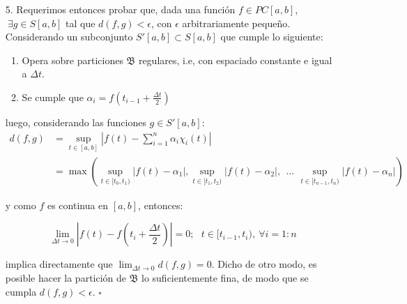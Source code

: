 \documentclass[spanish, fleqn]{article}
\begin{document}
\begin{itemize}
    tal sucesión puede construirse como sigue:
     \begin{displaymath}
       a_n = \left\{
     \begin{array}{lr}
       1 &  n = n_1 \\
       0 &  \text{otherwise}
     \end{array}
   \right.
   \end{displaymath}

   con $n_1 (\in \mathbb{N}) \rightarrow \infty$ se satisface (\ref{eq:req}).




    \item[5.] Requerimos entonces probar que, dada una función $f \in PC[a,b]$, $\ \exists g \in S[a,b]$ tal que $d(f,g)<\epsilon$, con $\epsilon$ arbitrariamente pequeño. Considerando un subconjunto $S'[a,b] \subset S[a,b]$ que cumple lo siguiente:

\begin{enumerate}
    \item Opera sobre particiones $\mathfrak{B}$ regulares, i.e, con espaciado constante e igual a $\Delta t$.
    \item Se cumple que $\alpha_i = f(t_{i-1}+\frac{\Delta t}{2})$
\end{enumerate}

luego, considerando las funciones $g \in S'[a,b]$:
\begin{equation} \label{eq1}
\begin{split}
d(f,g) & = \sup_{t\in [a,b]}{\left|f(t)-\sum_{i=1}^n \alpha_i \chi_i(t)\right|} \\
       & = \max \left(  \sup_{t \in [t_0,t_1)} |f(t)-\alpha_1|, \sup_{t \in [t_1,t_2)} |f(t)-\alpha_2|,\ \ \ldots \ \, \sup_{t \in [t_{n-1},t_n)} |f(t)-\alpha_n| \right)
\end{split}
\end{equation}

\noindent y como $f$ es continua en $[a,b]$, entonces:

\begin{equation}
    \lim_{\Delta t\rightarrow 0} \left|f(t)-f\left(t_i + \frac{\Delta t}{2}\right) \right| = 0; \ \ \ t \in [t_{i-1},t_i), \ \forall i=1:n
\end{equation}

\noindent implica directamente que $\displaystyle \lim_{\Delta t \rightarrow 0} d(f,g) = 0 $. Dicho de otro modo, es posible hacer la partición de $\mathfrak{B}$ lo suficientemente fina, de modo que se cumpla $d(f,g)<\epsilon$. $\square$
\end{itemize}
\end{document}
